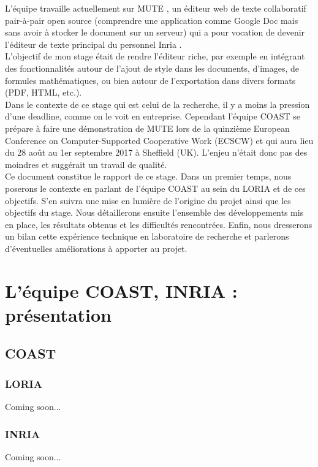 \documentclass[12pt]{article}
\begin{document}
L'équipe travaille actuellement sur MUTE \cite{mute}, un éditeur web de texte collaboratif pair-à-pair open source (comprendre une application comme Google Doc mais sans avoir à stocker le document sur un serveur) qui a pour vocation de devenir l'éditeur de texte principal du personnel Inria \cite{inria}.\\

L'objectif de mon stage était de rendre l'éditeur riche, par exemple en intégrant des fonctionnalités autour de l'ajout de style dans les documents, d'images, de formules mathématiques, ou bien autour de l'exportation dans divers formats (PDF, HTML, etc.).\\

Dans le contexte de ce stage qui est celui de la recherche, il y a moins la pression d'une deadline, comme on le voit en entreprise. Cependant l'équipe COAST se prépare à faire une démonstration de MUTE lors de la quinzième European Conference on Computer-Supported Cooperative Work (ECSCW) \cite{ecscw} et qui aura lieu du 28 août au 1er septembre 2017 à Sheffield (UK). L'enjeu n'était donc pas des moindres et suggérait un travail de qualité.\\

Ce document constitue le rapport de ce stage. Dans un premier temps, nous poserons le contexte en parlant de l'équipe COAST au sein du LORIA et de ces objectifs. S'en suivra une mise en lumière de l'origine du projet ainsi que les objectifs du stage. Nous détaillerons ensuite l'ensemble des développements mis en place, les résultats obtenus et les difficultés rencontrées. Enfin, nous dresserons un bilan cette expérience technique en laboratoire de recherche et parlerons d'éventuelles améliorations à apporter au projet.\\

\newpage
\section{L'équipe COAST, INRIA : présentation}
\subsection{COAST}
\subsubsection{LORIA}
Coming soon...
\subsubsection{INRIA}
Coming soon...
\end{document}
